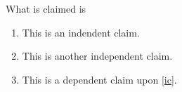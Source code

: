 

\noindent What is claimed is

  \begin{enumerate}

  \item[\clabel{ic}] This is an indendent claim.
  \item[\clabel{aic}] This is another independent claim.
  \item[\clabel{bcl}] This is a dependent claim upon \cref{ic}.

  \end{enumerate}

